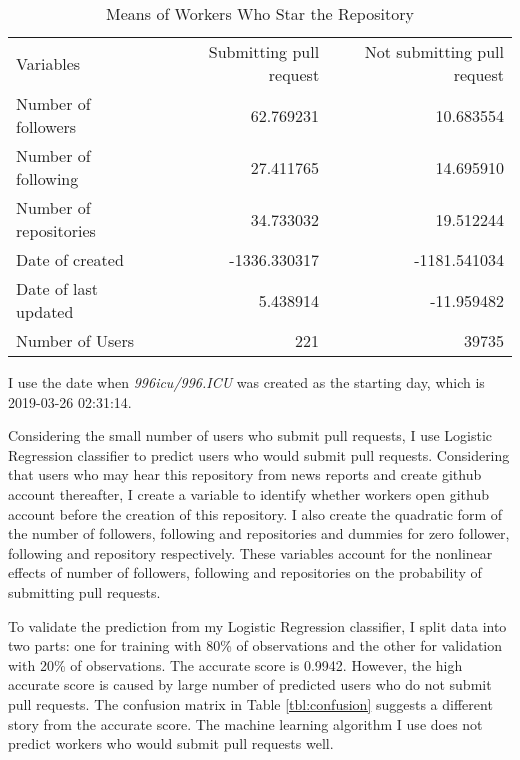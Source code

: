 \begin{table}[htbp]
    \caption{Means of Workers Who Star the Repository}\label{tbl:mean}
    \centering
    \begin{threeparttable}
    \begin{tabular}{lrr} \toprule
    Variables               &  Submitting pull request & Not submitting pull request \\
    Number of followers     &  62.769231               &  10.683554 \\
    Number of following     & 27.411765    & 14.695910 \\
    Number of repositories  &  34.733032   & 19.512244 \\
    Date of created         & -1336.330317 & -1181.541034 \\
    Date of last updated    &   5.438914   & -11.959482 \\ \midrule
    Number of Users         &  221         & 39735 \\ \bottomrule
    \end{tabular}
    \begin{tablenotes} \footnotesize
        \item I use the date when \textit{996icu/996.ICU} was created as the starting day, which is 2019-03-26 02:31:14.
    \end{tablenotes}
    \end{threeparttable}
\end{table}

Considering the small number of users who submit pull requests, I use Logistic Regression classifier to predict users who would submit pull requests. Considering that users who may hear this repository from news reports and create github account thereafter, I create a variable to identify whether workers open github account before the creation of this repository. I also create the quadratic form of the number of followers, following and repositories and dummies for zero follower, following and repository respectively. These variables account for the nonlinear effects of number of followers, following and repositories on the probability of submitting pull requests.

To validate the prediction from my Logistic Regression classifier, I split data into two parts: one for training with 80\% of observations and the other for validation with 20\% of observations. The accurate score is 0.9942. However, the high accurate score is caused by large number of predicted users who do not submit pull requests. The confusion matrix in Table \ref{tbl:confusion} suggests a different story from the accurate score. The machine learning algorithm I use does not predict workers who would submit pull requests well.

